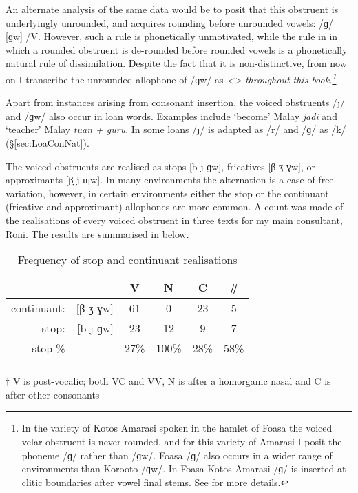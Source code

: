 An alternate analysis of the same data would be to posit that
this obstruent is underlyingly unrounded,
and acquires rounding before unrounded vowels:
/ɡ/ {\ra} [ɡw] /{\gap}V\tsc{[-round]}.
However, such a rule is phonetically unmotivated,
while the rule in  in which a rounded obstruent
is de-rounded before rounded vowels is a phonetically natural rule of dissimilation.
Despite the fact that it is non-distinctive,
from now on I transcribe the unrounded allophone
of /ɡw/ as \it{<}\it{>} throughout this book.\footnote{
		In the variety of Kotos Amarasi spoken in the hamlet of Fo{\Q}asa{\Q} the voiced velar obstruent is never rounded,
		and for this variety of Amarasi I posit the phoneme /ɡ/ rather than /ɡw/.
		Fo{\Q}asa{\Q} /ɡ/ also occurs in a wider range of environments than Koro{\Q}oto /ɡw/.
		In Fo{\Q}asa{\Q} Kotos Amarasi /ɡ/
		is inserted at clitic boundaries after vowel final stems.
		See  for more details.}

Apart from instances arising from consonant insertion,
the voiced obstruents /\j/ and /ɡw/ also occur in loan words.
Examples include  `become' {\la} Malay \emph{jadi}
and  `teacher' {\la} Malay \emph{tuan + guru}.
In some loans /\j/ is adapted as /r/
and /ɡ/ as /k/ ({\S}\ref{sec:LoaConNat}).

The voiced obstruents are realised as stops [b {\j} ɡw],
fricatives [β ʒ ɣw], or approximants [β̞ j ɰw].
In many environments the alternation is a case of free variation,
however, in certain environments either the stop or the continuant
(fricative and approximant) allophones are more common.
A count was made of the realisations of every voiced obstruent in three texts for my main consultant, Roni.
The results are summarised in  below.

\begin{table}[h]
	\centering\caption[Frequency of stop and continuant realisations]
	{Frequency of stop and continuant realisations}\label{tab:FreStoConRea}
		\begin{threeparttable}[b]
		\begin{tabular}{rrcccc} \lsptoprule
									&							&V{\gap}	& N{\gap} & C{\gap} & {\#}{\gap} \\ \midrule
			continuant:	&[β ʒ ɣw]			&61				&0				&23				&5 \\
			stop: 			&[b {\j} ɡw]	&23				&12				&9				&7 \\
			stop \%			&							&27\%			&100\%		&28\%			&58\% \\ \lspbottomrule
		\end{tabular}
		\begin{tablenotes}
		\item [†] V{\gap} is post-vocalic; both V{\gap}C and V{\gap}V,
							N{\gap} is after a homorganic nasal and C{\gap} is
							after other consonants
		\end{tablenotes}
	\end{threeparttable}
\end{table}

